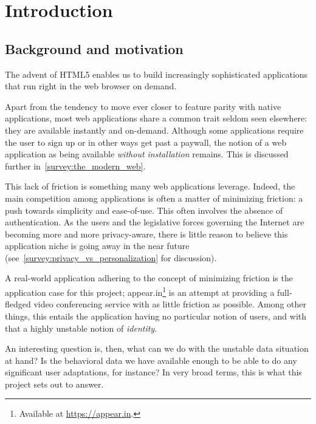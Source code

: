 \chapter{Introduction}

\label{Chapter1}


\section{Background and motivation}
\label{intro:background_and_motivation}

  The advent of HTML5 enables us to build increasingly sophisticated applications that run right in the web browser on demand.

  Apart from the tendency to move ever closer to feature parity with native applications, most web applications share a common trait seldom seen elsewhere: they are available instantly and on-demand. Although some applications require the user to sign up or in other ways get past a paywall, the notion of a web application as being available \emph{without installation} remains. This is discussed further in~\ref{survey:the_modern_web}.

  This lack of friction is something many web applications leverage. Indeed, the main competition among applications is often a matter of minimizing friction: a push towards simplicity and ease-of-use. This often involves the absence of authentication. As the users and the legislative forces governing the Internet are becoming more and more privacy-aware, there is little reason to believe this application niche is going away in the near future (see~\ref{survey:privacy_vs_personalization} for discussion).

  A real-world application adhering to the concept of minimizing friction is the application case for this project; appear.in\footnote{Available at \url{https://appear.in}.} is an attempt at providing a full-fledged video conferencing service with as little friction as possible. Among other things, this entails the application having no particular notion of users, and with that a highly unstable notion of \emph{identity}.

  An interesting question is, then, what can we do with the unstable data situation at hand? Is the behavioral data we have available enough to be able to do any significant user adaptations, for instance? In very broad terms, this is what this project sets out to answer.

